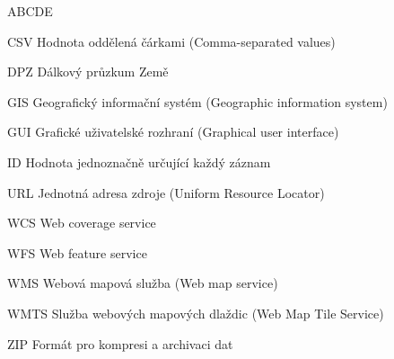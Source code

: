 
\begin{seznamzkratek}{ABCDE}      
	             	                   
          {CSV}
          {Hodnota oddělená čárkami (Comma-separated values)} 
          
	      {DPZ}
	      {Dálkový průzkum Země}  
          
	      {GIS}
	      {Geografický informační systém (Geographic information system)}

	      {GUI}
	      {Grafické uživatelské rozhraní (Graphical user interface)}
	               	             
	      {ID}
	      {Hodnota jednoznačně určující každý záznam} 	      	     
	          
          {URL}
          {Jednotná adresa zdroje (Uniform Resource Locator)}                
          
	      {WCS}
	      {Web coverage service}
                                          
	      {WFS}
	      {Web feature service}         
            
	      {WMS}
	      {Webová mapová služba (Web map service)} 	

	      {WMTS}
	      {Služba webových mapových dlaždic (Web Map Tile Service)} 
          
          {ZIP}
          {Formát pro kompresi a archivaci dat} 	
          
	      	      
\end{seznamzkratek}